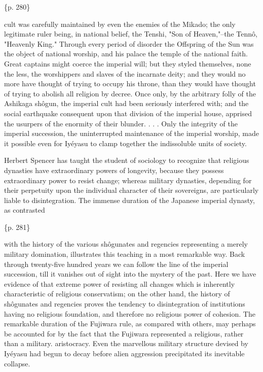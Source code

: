 \{p. 280\}

cult was carefully maintained by even the enemies of the Mikado; the only legitimate ruler being, in national belief, the Tenshi, "Son of Heaven,"--the Tennô, "Heavenly King." Through every period of disorder the Offspring of the Sun was the object of national worship, and his palace the temple of the national faith. Great captains might coerce the imperial will; but they styled themselves, none the less, the worshippers and slaves of the incarnate deity; and they would no more have thought of trying to occupy his throne, than they would have thought of trying to abolish all religion by decree. Once only, by the arbitrary folly of the Ashikaga shôgun, the imperial cult had been seriously interfered with; and the social earthquake consequent upon that division of the imperial house, apprised the usurpers of the enormity of their blunder. . . . Only the integrity of the imperial succession, the uninterrupted maintenance of the imperial worship, made it possible even for Iyéyasu to clamp together the indissoluble units of society.

Herbert Spencer has taught the student of sociology to recognize that religious dynasties have extraordinary powers of longevity, because they possess extraordinary power to resist change; whereas military dynasties, depending for their perpetuity upon the individual character of their sovereigns, are particularly liable to disintegration. The immense duration of the Japanese imperial dynasty, as contrasted

\{p. 281\}

with the history of the various shôgunates and regencies representing a merely military domination, illustrates this teaching in a most remarkable way. Back through twenty-five hundred years we can follow the line of the imperial succession, till it vanishes out of sight into the mystery of the past. Here we have evidence of that extreme power of resisting all changes which is inherently characteristic of religious conservatism; on the other hand, the history of shôgunates and regencies proves the tendency to disintegration of institutions having no religious foundation, and therefore no religious power of cohesion. The remarkable duration of the Fujiwara rule, as compared with others, may perhaps be accounted for by the fact that the Fujiwara represented a religious, rather than a military. aristocracy. Even the marvellous military structure devised by Iyéyasu had begun to decay before alien aggression precipitated its inevitable collapse.

